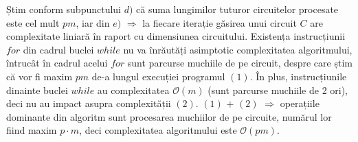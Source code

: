 \documentclass[a4paper,12pt]{article}
\begin{document}
Știm conform subpunctului $d)$ că suma lungimilor tuturor circuitelor procesate este cel mult $pm$, iar din $e)$ $\Rightarrow$ la fiecare iterație găsirea unui circuit $C$ are complexitate liniară în raport cu dimensiunea circuitului. Existența instrucțiunii $for$ din cadrul buclei $while$ nu va înrăutăți asimptotic complexitatea algoritmului, întrucât în cadrul acelui $for$ sunt parcurse muchiile de pe circuit, despre care știm că vor fi maxim $pm$ de-a lungul execuției programul $(1)$. În plus, instrucțiunile dinainte buclei $while$ au complexitatea $\mathcal{O}(m)$ (sunt parcurse muchiile de 2 ori), deci nu au impact asupra complexității $(2)$. $(1)$ $+$ $(2)$ $\Rightarrow$ operațiile dominante din algoritm sunt procesarea muchiilor de pe circuite, numărul lor fiind maxim $p \cdot m$, deci complexitatea algoritmului este $\mathcal{O}(pm)$.
\end{document}
